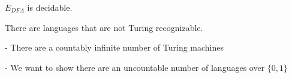     \begin{theorem}
        $E_{DFA}$ is decidable.
    \end{theorem}



\begin{theorem}
    There are languages that are not Turing recognizable.
\end{theorem}

    -   There are a countably infinite number of Turing machines

    -   We want to show there are an uncountable number of languages over $\{0,1\}$






